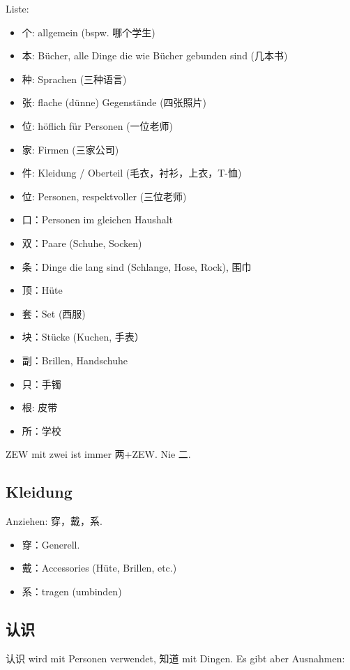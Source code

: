 \documentclass[UTF8]{ctexart}
\begin{document}
Liste:

\begin{itemize}
    \item 个: allgemein (bspw. 哪个学生)
    \item 本: Bücher, alle Dinge die wie Bücher gebunden sind (几本书)
    \item 种: Sprachen (三种语言)
    \item 张: flache (dünne) Gegenstände (四张照片)
    \item 位: höflich für Personen (一位老师)
    \item 家: Firmen (三家公司)
    \item 件: Kleidung / Oberteil (毛衣，衬衫，上衣，T-恤)
    \item 位: Personen, respektvoller (三位老师)
    \item 口：Personen im gleichen Haushalt
    \item 双：Paare (Schuhe, Socken)
    \item 条：Dinge die lang sind (Schlange, Hose, Rock), 围巾
    \item 顶：Hüte
    \item 套：Set (西服)
    \item 块：Stücke (Kuchen, 手表）
    \item 副：Brillen, Handschuhe
    \item 只：手镯
    \item 根: 皮带
    \item 所：学校
\end{itemize}

ZEW mit zwei ist immer 两+ZEW. Nie 二.

\subsection{Kleidung}

Anziehen: 穿，戴，系.

\begin{itemize}
    \item 穿：Generell.
    \item 戴：Accessories (Hüte, Brillen, etc.)
    \item 系：tragen (umbinden)
\end{itemize}

\subsection{认识}

认识 wird mit Personen verwendet, 知道 mit Dingen. Es gibt aber Ausnahmen:
\end{document}
